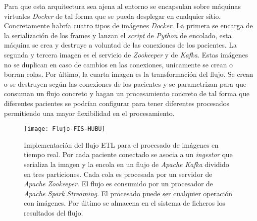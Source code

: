 Para que esta arquitectura sea ajena al entorno se encapsulan sobre máquinas virtuales \textit{Docker} de tal forma que se pueda desplegar en cualquier sitio. Concretamente habría cuatro tipos de imágenes \textit{Docker}. La primera se encarga de la serialización de los frames y lanzan el \textit{script} de \textit{Python} de encolado, esta máquina se crea y destruye a voluntad de las conexiones de los pacientes. La segunda y tercera imagen es el servicio de \textit{Zookeeper} y de \textit{Kafka}. Estas imágenes no se duplican en caso de cambios en las conexiones, unicamente se crean o borran colas. Por último, la cuarta imagen es la transformación del flujo. Se crean o se destruyen según las conexiones de los pacientes y se parametrizan para que consuman un flujo concreto y hagan un procesamiento concreto de tal forma que diferentes pacientes se podrían configurar para tener diferentes procesados permitiendo una mayor flexibilidad en el procesamiento.

\begin{figure}[H]
	\centering
	\texttt{[image: Flujo-FIS-HUBU]}
	\caption[Implementación del flujo ETL para el procesado de imágenes en tiempo real.]{Implementación del flujo ETL para el procesado de imágenes en tiempo real. Por cada paciente conectado se asocia a un \textit{ingestor} que serializa la imagen y la encola en un flujo de \textit{Apache Kafka} dividido en tres particiones. Cada cola es procesada por un servidor de \textit{Apache Zookeeper}. El flujo es consumido por un procesador de \textit{Apache Spark Streaming}. El procesado puede ser cualquier operación con imágenes. Por último se almacena en el sistema de ficheros los resultados del flujo.}
	\label{fig:flujoetlreal}
\end{figure}



